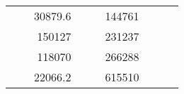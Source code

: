 \begin{table}[H]
\begin{tabular}{|ccrccrccc}
\multicolumn{1}{|c|}{\cellcolor[HTML]{FFFFC7}}                                & \multicolumn{1}{c|}{\cellcolor[HTML]{DDFDFF}}                      & \multicolumn{1}{r|}{\cellcolor[HTML]{DAE8FC}30879.6}   & \multicolumn{1}{c|}{\cellcolor[HTML]{FFFFC7}}                                & \multicolumn{1}{c|}{\cellcolor[HTML]{DDFDFF}}                       & \multicolumn{1}{r|}{\cellcolor[HTML]{DDFDFF}144761}    &                                                                              &                                                                    &                                                        \\ \cline{3-3} \cline{6-6}
\multicolumn{1}{|c|}{\cellcolor[HTML]{FFFFC7}}                                & \multicolumn{1}{c|}{\cellcolor[HTML]{DDFDFF}}                      & \multicolumn{1}{r|}{\cellcolor[HTML]{DDFDFF}150127}    & \multicolumn{1}{c|}{\cellcolor[HTML]{FFFFC7}}                                & \multicolumn{1}{c|}{\cellcolor[HTML]{DDFDFF}}                       & \multicolumn{1}{r|}{\cellcolor[HTML]{DAE8FC}231237}    &                                                                              &                                                                    &                                                        \\ \cline{3-3} \cline{6-6}
\multicolumn{1}{|c|}{\cellcolor[HTML]{FFFFC7}}                                & \multicolumn{1}{c|}{\cellcolor[HTML]{DDFDFF}}                      & \multicolumn{1}{r|}{\cellcolor[HTML]{DAE8FC}118070}    & \multicolumn{1}{c|}{\cellcolor[HTML]{FFFFC7}}                                & \multicolumn{1}{c|}{\cellcolor[HTML]{DDFDFF}}                       & \multicolumn{1}{r|}{\cellcolor[HTML]{DDFDFF}266288}    &                                                                              &                                                                    &                                                        \\ \cline{3-3} \cline{6-6}
\multicolumn{1}{|c|}{\cellcolor[HTML]{FFFFC7}}                                & \multicolumn{1}{c|}{\cellcolor[HTML]{DDFDFF}}                      & \multicolumn{1}{r|}{\cellcolor[HTML]{DDFDFF}22066.2}   & \multicolumn{1}{c|}{\cellcolor[HTML]{FFFFC7}}                                & \multicolumn{1}{c|}{\cellcolor[HTML]{DDFDFF}}                       & \multicolumn{1}{r|}{\cellcolor[HTML]{DAE8FC}615510}    &                                                                              &                                                                    &                                                        \\ \cline{3-3} \cline{6-6}

\end{tabular}
\end{table}
